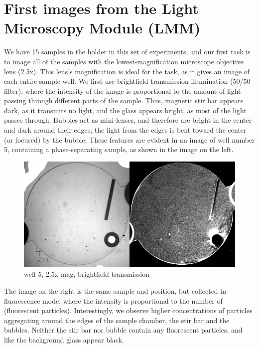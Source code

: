 \section{First images from the Light Microscopy Module (LMM)}\label{first-images-from-the-light-microscopy-module-lmm}
We have 15 samples in the holder in this set of experiments, and our first task
is to image all of the samples with the lowest-magnification microscope
objective lens (2.5x). This lens's magnification is ideal for the task, as it
gives an image of each entire sample well. We first use brightfield transmission
illumination (50/50 filter), where the intensity of the image is proportional to
the amount of light passing through different parts of the sample. Thus,
magnetic stir bar appears dark, as it transmits no light, and the glass appears
bright, as most of the light passes through. Bubbles act as mini-lenses, and
therefore are bright in the center and dark around their edges; the light from
the edges is bent toward the center (or focused) by the bubble. These features
are evident in an image of well number 5, containing a phase-separating sample,
as shown in the image on the left.
\begin{figure}
\begin{center}
\includegraphics[width=\columnwidth]{./images/2014_06_04_first_day/140604_well5_2p5x.png}
\caption{well 5, 2.5x mag, brightfield transmission}
\end{center}
\end{figure}

The image on the right is the same sample and position, but collected in
fluorescence mode, where the intensity is proportional to the number of
(fluorescent particles). Interestingly, we observe higher concentrations of
particles aggregating around the edges of the sample chamber, the stir bar and
the bubbles. Neither the stir bar nor bubble contain any fluorescent particles,
and like the background glass appear black.

